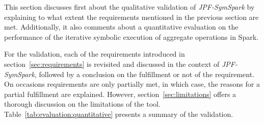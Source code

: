 
This section discusses first about the qualitative validation of \textit{JPF-SymSpark} by explaining to what extent the requirements mentioned in the previous section are met. Additionally, it also comments about a quantitative evaluation on the performance of the iterative symbolic execution of aggregate operations in Spark.


For the validation, each of the requirements introduced in section~\ref{sec:requirements} is revisited and discussed in the context of \textit{JPF-SymSpark}, followed by a conclusion on the fulfillment or not of the requirement. On occasions requirements are only partially met, in which case, the reasons for a partial fulfillment are explained. However, section~\ref{sec:limitations} offers a thorough discussion on the limitations of the tool. Table~\ref{tab:evaluation:quantitative} presents a summary of the validation.

